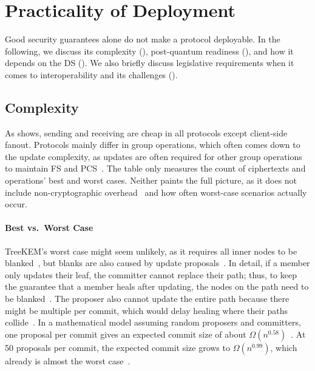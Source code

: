 \documentclass[conference]{IEEEtran}
\begin{document}
\section{Practicality of Deployment}\label{sec:practicality}
Good security guarantees alone do not make a protocol deployable.
In the following, we discuss its complexity (), post-quantum readiness (), and how it depends on the \ac{DS} ().
We also briefly discuss legislative requirements when it comes to interoperability and its challenges ().

\subsection{Complexity}\label{sec:complexity}
As  shows, sending and receiving are cheap in all protocols except client-side fanout.
Protocols mainly differ in group operations, which often comes down to the update complexity, as updates are often required for other group operations to maintain \ac{FS} and \ac{PCS}~\cite{barnesMessagingLayerSecurity2023}.
The table only measures the count of ciphertexts and operations' best and worst cases.
Neither paints the full picture, as it does not include non-cryptographic overhead~\cite{solerAnalysisEfficiencyMessaging2025} and how often worst-case scenarios actually occur.

\paragraph{Best vs.\ Worst Case}
TreeKEM's worst case might seem unlikely, as it requires all inner nodes to be blanked~\cite{solerAnalysisEfficiencyMessaging2025,auerbachContinuousGroupKeyAgreement2025}, but blanks are also caused by update proposals~\cite{barnesMessagingLayerSecurity2023,auerbachContinuousGroupKeyAgreement2025}.
In detail, if a member only updates their leaf, the committer cannot replace their path; thus, to keep the guarantee that a member heals after updating, the nodes on the path need to be blanked~\cite{barnesMessagingLayerSecurity2023,auerbachContinuousGroupKeyAgreement2025}.
The proposer also cannot update the entire path because there might be multiple per commit, which would delay healing where their paths collide~\cite{auerbachContinuousGroupKeyAgreement2025}.
In a mathematical model assuming random proposers and committers, one proposal per commit gives an expected commit size of about $\Omega(n^{0.58})$~\cite{auerbachContinuousGroupKeyAgreement2025}.
At 50 proposals per commit, the expected commit size grows to $\Omega(n^{0.99})$, which already is almost the worst case~\cite{auerbachContinuousGroupKeyAgreement2025}.
\end{document}

